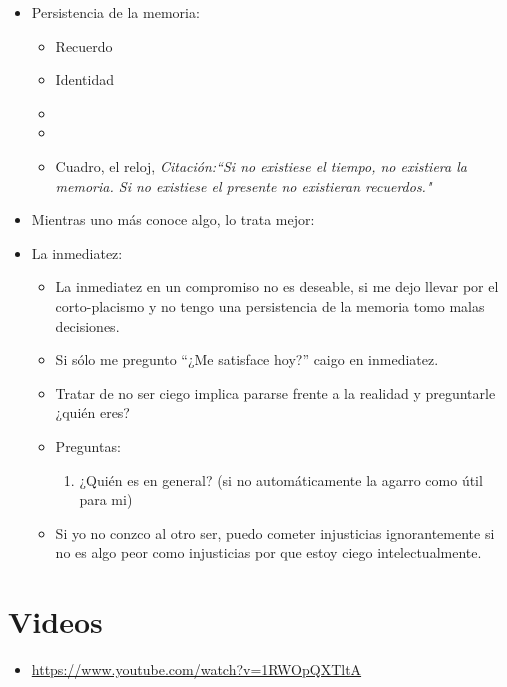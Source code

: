 \begin{itemize}
     \item Persistencia de la memoria:
        \begin{itemize}
            \item Recuerdo 
            \item Identidad 
            \item 
        \end{itemize}
        \begin{itemize}[label=\#]
            \item 
        \end{itemize}
        \begin{itemize}
            \item Cuadro, el reloj, \emph{Citación:``Si no existiese el tiempo, no existiera la memoria. Si no existiese el presente no existieran recuerdos."}
        \end{itemize}
    
    \item Mientras uno más conoce algo, lo trata mejor:
    
    \item La inmediatez:
        \begin{itemize}[label=\#]
            \item La inmediatez en un compromiso no es deseable, si me dejo llevar por el corto-placismo y no tengo una persistencia de la memoria tomo malas decisiones.
            \item Si sólo me pregunto ``¿Me satisface hoy?'' caigo en inmediatez.
            \item Tratar de no ser ciego implica pararse frente a la realidad y preguntarle ¿quién eres?
            \item Preguntas:
                \begin{enumerate}
                    \item ¿Quién es en general? (si no automáticamente la agarro como útil para mi)
                \end{enumerate}
            
            \item Si yo no conzco al otro ser, puedo cometer injusticias ignorantemente si no es algo peor como injusticias por que estoy ciego intelectualmente.
        \end{itemize}
\end{itemize}


\section{Videos}
\begin{itemize}
    \item \url{https://www.youtube.com/watch?v=1RWOpQXTltA}
\end{itemize}


